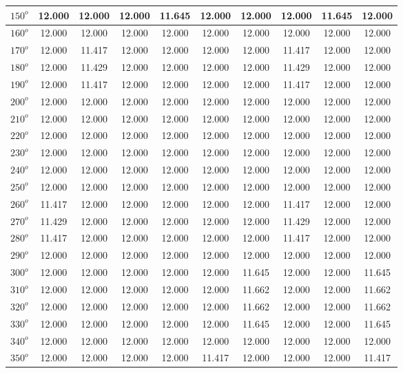 \begin{table}[H]
\begin{tabular}{|c|c|c|c|c|c|c|c|c|c|}
	    $150^{o}$ & 12.000 & 12.000 & 12.000 & 11.645 & 12.000 & 12.000 & 12.000 & 11.645 & 12.000 \\
	    \hline
	    $160^{o}$ & 12.000 & 12.000 & 12.000 & 12.000 & 12.000 & 12.000 & 12.000 & 12.000 & 12.000 \\
	    \hline
	    $170^{o}$ & 12.000 & 11.417 & 12.000 & 12.000 & 12.000 & 12.000 & 11.417 & 12.000 & 12.000 \\
	    \hline
	    $180^{o}$ & 12.000 & 11.429 & 12.000 & 12.000 & 12.000 & 12.000 & 11.429 & 12.000 & 12.000 \\
	    \hline
	    $190^{o}$ & 12.000 & 11.417 & 12.000 & 12.000 & 12.000 & 12.000 & 11.417 & 12.000 & 12.000 \\
	    \hline
	    $200^{o}$ & 12.000 & 12.000 & 12.000 & 12.000 & 12.000 & 12.000 & 12.000 & 12.000 & 12.000 \\
	    \hline
	    $210^{o}$ & 12.000 & 12.000 & 12.000 & 12.000 & 12.000 & 12.000 & 12.000 & 12.000 & 12.000 \\
	    \hline
	    $220^{o}$ & 12.000 & 12.000 & 12.000 & 12.000 & 12.000 & 12.000 & 12.000 & 12.000 & 12.000 \\
	    \hline
	    $230^{o}$ & 12.000 & 12.000 & 12.000 & 12.000 & 12.000 & 12.000 & 12.000 & 12.000 & 12.000 \\
	    \hline
	    $240^{o}$ & 12.000 & 12.000 & 12.000 & 12.000 & 12.000 & 12.000 & 12.000 & 12.000 & 12.000 \\
	    \hline
	    $250^{o}$ & 12.000 & 12.000 & 12.000 & 12.000 & 12.000 & 12.000 & 12.000 & 12.000 & 12.000 \\
	    \hline
	    $260^{o}$ & 11.417 & 12.000 & 12.000 & 12.000 & 12.000 & 12.000 & 11.417 & 12.000 & 12.000 \\
	    \hline
	    $270^{o}$ & 11.429 & 12.000 & 12.000 & 12.000 & 12.000 & 12.000 & 11.429 & 12.000 & 12.000 \\
	    \hline
	    $280^{o}$ & 11.417& 12.000 & 12.000 & 12.000 & 12.000 & 12.000 & 11.417 & 12.000 & 12.000 \\
	    \hline
	    $290^{o}$ & 12.000 & 12.000 & 12.000 & 12.000 & 12.000 & 12.000 & 12.000 & 12.000 & 12.000 \\
	    \hline
	    $300^{o}$ & 12.000 & 12.000 & 12.000 & 12.000 & 12.000 & 11.645 & 12.000 & 12.000 & 11.645 \\
	    \hline
	    $310^{o}$ & 12.000 & 12.000 & 12.000 & 12.000 & 12.000 & 11.662 & 12.000 & 12.000 & 11.662 \\
	    \hline
	    $320^{o}$ & 12.000 & 12.000 & 12.000 & 12.000 & 12.000 & 11.662 & 12.000 & 12.000 & 11.662 \\
	    \hline
	    $330^{o}$ & 12.000 & 12.000 & 12.000 & 12.000 & 12.000 & 11.645 & 12.000 & 12.000 & 11.645 \\
	    \hline
	    $340^{o}$ & 12.000 & 12.000 & 12.000 & 12.000 & 12.000 & 12.000 & 12.000 & 12.000 & 12.000 \\
	    \hline
	    $350^{o}$ & 12.000 & 12.000 & 12.000 & 12.000 & 11.417 & 12.000 & 12.000 & 12.000 & 11.417 \\
	    \hline
	    \end{tabular}
	    

\end{table}
